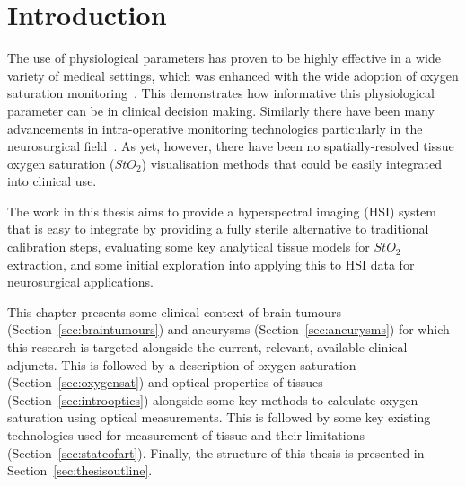 \chapter{Introduction}
\label{chap:intro}

\minitoc

The use of physiological parameters has proven to be highly effective in a wide variety of medical settings, which was enhanced with the wide adoption of oxygen saturation monitoring~\citep{Williams2022}. This demonstrates how informative this physiological parameter can be in clinical decision making. Similarly there have been many advancements in intra-operative monitoring technologies particularly in the neurosurgical field~\citep{Raith2020}. As yet, however, there have been no spatially-resolved tissue oxygen saturation ($StO_2$) visualisation methods that could be easily integrated into clinical use. 

The work in this thesis aims to provide a hyperspectral imaging (HSI) system that is easy to integrate by providing a fully sterile alternative to traditional calibration steps, evaluating some key analytical tissue models for $StO_2$ extraction, and some initial exploration into applying this to HSI data for neurosurgical applications. 

This chapter presents some clinical context of brain tumours (Section~\ref{sec:braintumours}) and aneurysms (Section~\ref{sec:aneurysms}) for which this research is targeted alongside the current, relevant, available clinical adjuncts. This is followed by a description of oxygen saturation (Section~\ref{sec:oxygensat}) and optical properties of tissues (Section~\ref{sec:introoptics}) alongside some key methods to calculate oxygen saturation using optical measurements. This is followed by some key existing technologies used for measurement of tissue and their limitations (Section~\ref{sec:stateofart}). Finally, the structure of this thesis is presented in Section~\ref{sec:thesisoutline}.

%
